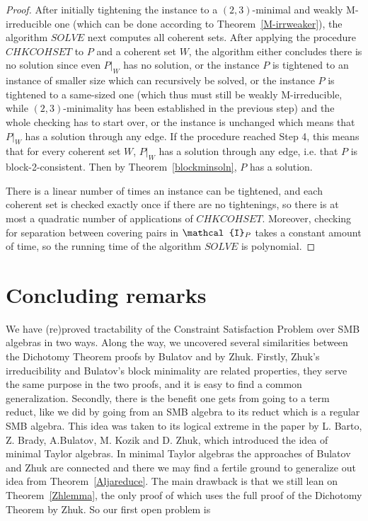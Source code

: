 \documentclass[11pt]{amsart}
\newcommand{\vr}[1]{{\uppercase {\mathcal{#1}}}}
\theoremstyle{definition}
\begin{document}
\begin{proof}
After initially tightening the instance to a $(2,3)$-minimal and weakly M-irreducible one (which can be done according to Theorem~\ref{M-irrweaker}), the algorithm $SOLVE$ next computes all coherent sets. After applying the procedure $CHKCOHSET$ to $P$ and a coherent set $W$, the algorithm either concludes there is no solution since even $P|_W$ has no solution, or the instance $P$ is tightened to an instance of smaller size which can recursively be solved, or the instance $P$ is tightened to a same-sized one (which thus must still be weakly M-irreducible, while $(2,3)$-minimality has been established in the previous step) and the whole checking has to start over, or the instance is unchanged which means that $P|_W$ has a solution through any edge. If the procedure reached Step 4, this means that for every coherent set $W$, $P|_W$ has a solution through any edge, i.e. that $P$ is block-2-consistent. Then by Theorem~\ref{blockminsoln}, $P$ has a solution.

There is a linear number of times an instance can be tightened, and each coherent set is checked exactly once if there are no tightenings, so there is at most a quadratic number of applications of $CHKCOHSET$. Moreover, checking for separation between covering pairs in $\vr i_P$ takes a constant amount of time, so the running time of the algorithm $SOLVE$ is polynomial.
\end{proof}

\section{Concluding remarks}

We have (re)proved tractability of the Constraint Satisfaction Problem over SMB algebras in two ways. Along the way, we uncovered several similarities between the Dichotomy Theorem proofs by Bulatov and by Zhuk. Firstly, Zhuk's irreducibility and Bulatov's block minimality are related properties, they serve the same purpose in the two proofs, and it is easy to find a common generalization. Secondly, there is the benefit one gets from going to a term reduct, like we did by going from an SMB algebra to its reduct which is a regular SMB algebra. This idea was taken to its logical extreme in the paper \cite{dreamteam} by L. Barto, Z. Brady, A.Bulatov, M. Kozik and D. Zhuk, which introduced the idea of minimal Taylor algebras. In minimal Taylor algebras the approaches of Bulatov and Zhuk are connected and there we may find a fertile ground to generalize out idea from Theorem~\ref{Aljareduce}. The main drawback is that we still lean on Theorem~\ref{Zhlemma}, the only proof of which uses the full proof of the Dichotomy Theorem by Zhuk. So our first open problem is
\end{document}
